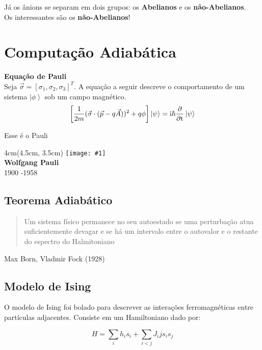 \documentclass[t]{beamer}
\newcommand{\ii}{
	\rm{i}
}
\newcommand{\ket}[1]{\ensuremath{\left|#1\right\rangle}}
\newcommand{\frasepor}[2]{
	\begin{center}
		\begin{quote}
			#1
		\end{quote}
		\hfill {\small #2}
	\end{center}
}
\newcommand{\person}[6]{%
\begin{textblock*}{#4}(#5, #6)
	\texttt{[image: \#1]}\\
	\textbf{#2}\\
	{\small #3}
\end{textblock*}
}
\begin{document}
	\begin{frame}{\subsecname}
	Já os ânions se separam em dois grupos: os \textbf{Abelianos} e os \textbf{não-Abelianos}.\\
	
	Os interessantes são os \textbf{não-Abelianos}!
	\end{frame}
	
	
	
	\section{Computação Adiabática}
	
	\begin{frame}{\secname}
	\textbf{Equação de Pauli}\\
	Seja $\vec{\sigma} = [\sigma_1, \sigma_2, \sigma_3]^T$. A equação a seguir descreve o comportamento de um sistema $\ket{\phi}$ sob um campo magnético.
	$$\left[{\frac {1}{2m}}({\vec {\sigma }}\cdot ({\vec {p}}-q{\vec {A}}))^{2}+q\phi \right]\ket{\psi} = \ii\hbar {\frac {\partial }{\partial t}}\ket{\psi}$$
	\end{frame}	
	
	\begin{frame}{\secname}
	Esse é o Pauli
	
	\person{pauli.jpg}{Wolfgang Pauli}{1900 -1958}{4cm}{4.5cm}{3.5cm}	
	
	\end{frame}
	
	\subsection{Teorema Adiabático}
	\begin{frame}{\subsecname}
	\frasepor{Um sistema físico permanece no seu autoestado se uma perturbação atua suficientemente devagar e se há um intervalo entre o autovalor e o restante do espectro do Halmitoniano}{Max Born, Vladmir Fock (1928)}
	\end{frame}
	
	\subsection{Modelo de Ising}
	
	\begin{frame}{\subsecname}	
	O modelo de Ising foi bolado para descrever as interações ferromagnéticas entre partículas adjacentes. Consiste em um Hamiltoniano dado por:
	
	$$H = \sum_{i} h_i s_i + \sum_{i < j} J_ij s_i s_j$$
	
	\end{frame}
	
\end{document}
